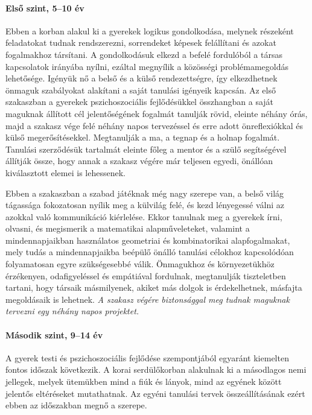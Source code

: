 \paragraph{Első szint, 5--10 év }

Ebben a korban alakul ki a gyerekek logikus gondolkodása, melynek részeként feladatokat tudnak rendszerezni, sorrendeket képesek felállítani és azokat fogalmakhoz társítani. A gondolkodásuk elkezd a befelé fordulóból a társas kapcsolatok irányába nyílni, ezáltal megnyílik a közösségi problémamegoldás lehetősége. Igényük nő a belső és a külső rendezettségre, így elkezdhetnek önmaguk szabályokat alakítani a saját tanulási igényeik kapcsán. Az első szakaszban a gyerekek pszichoszociális fejlődésükkel összhangban a saját maguknak állított cél jelentőségének fogalmát tanulják rövid, eleinte néhány órás, majd a szakasz vége felé néhány napos tervezéssel és erre adott önreflexiókkal és külső megerősítésekkel.  Megtanulják a ma, a tegnap és a holnap fogalmát. Tanulási szerződésük tartalmát eleinte főleg a mentor és a szülő segítségével állítják össze, hogy annak a szakasz végére már teljesen egyedi, önállóan kiválasztott elemei is lehessenek.

Ebben a szakaszban a szabad játéknak még nagy szerepe van, a belső világ tágassága fokozatosan nyílik meg a külvilág felé, és kezd lényegessé válni az azokkal való kommunikáció kiérlelése. Ekkor tanulnak meg a gyerekek írni, olvasni, és megismerik a matematikai alapműveleteket, valamint a mindennapjaikban használatos  geometriai és kombinatorikai alapfogalmakat, mely tudás a mindennapjaikba beépülő önálló tanulási célokhoz kapcsolódóan folyamatosan egyre szükségesebbé válik. Önmagukhoz és környezetükhöz érzékenyen, odafigyeléssel és empátiával fordulnak, megtanulják tiszteletben tartani, hogy társaik másmilyenek, akiket más dolgok is érdekelhetnek, másfajta megoldásaik is lehetnek. \emph{A szakasz végére biztonsággal meg tudnak maguknak tervezni egy néhány napos projektet.}\vfill\eject

\paragraph{Második szint, 9--14 év}

A gyerek testi és pszichoszociális fejlődése szempontjából egyaránt kiemelten fontos időszak következik. A korai serdülőkorban alakulnak ki a másodlagos nemi jellegek, melyek ütemükben mind a fiúk és lányok, mind az egyének között jelentős eltéréseket mutathatnak. Az egyéni tanulási tervek összeállításának ezért ebben az időszakban megnő a szerepe.

